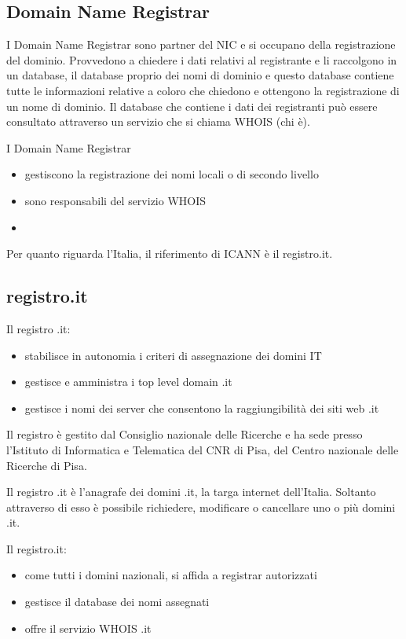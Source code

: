 \subsection{Domain Name Registrar}
I Domain Name Registrar sono partner del NIC e si occupano della registrazione del dominio.
Provvedono a chiedere i dati relativi al registrante e li raccolgono in un database, il database proprio dei nomi di dominio e questo database contiene tutte le informazioni relative a coloro che chiedono e ottengono la registrazione di un nome di dominio. Il database che contiene i dati dei registranti può essere consultato attraverso un servizio che si chiama WHOIS (chi è).

I Domain Name Registrar
\begin{itemize}
    \item gestiscono la registrazione dei nomi locali o di secondo livello
    \item sono responsabili del servizio WHOIS
    \item
\end{itemize}{}

Per quanto riguarda l'Italia, il riferimento di ICANN è il registro.it.
\subsection{registro.it}
Il registro .it:
\begin{itemize}
    \item stabilisce in autonomia i criteri di assegnazione dei domini IT
    \item gestisce e amministra i top level domain .it
    \item gestisce i nomi dei server che consentono la raggiungibilità dei siti web .it
\end{itemize}

Il registro è gestito dal Consiglio nazionale delle Ricerche e ha sede presso l'Istituto di Informatica e Telematica del CNR di Pisa, del Centro nazionale delle Ricerche di Pisa.\par
Il registro .it è l'anagrafe dei domini .it, la targa internet dell'Italia. Soltanto attraverso di esso è possibile richiedere, modificare o cancellare uno o più domini .it.\par
Il registro.it:
\begin{itemize}
    \item come tutti i domini nazionali, si affida a registrar autorizzati
    \item gestisce il database dei nomi assegnati
    \item offre il servizio WHOIS .it
\end{itemize}

